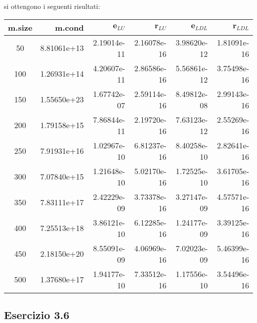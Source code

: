 si ottengono i seguenti risultati:\\
\begin{tabular}{ | c | r | r | r | r | r | }
\hline
        \textbf{m.size} & \textbf{m.cond} & $\mathbf{e}_{LU} $ & $\mathbf{r}_{LU} $  &  $\mathbf{e}_{LDL}$  &  $\mathbf{r}_{LDL} $ \\
\hline
         50    &     8.81061e+13 		&  2.19014e-11  &  2.16078e-16  &  3.98620e-12  &  1.81091e-16  \\
        100    &    1.26931e+14  	&  4.20607e-11  &  2.86586e-16  &  5.56861e-12  &  3.75498e-16  \\
        150    &    1.55650e+23  	&  1.67742e-07  &  2.59114e-16  &  8.49812e-08  &  2.99143e-16  \\
        200    &    1.79158e+15  	&  7.86844e-11  &  2.19720e-16  &  7.63123e-12  &  2.55269e-16  \\
        250    &    7.91931e+16  	&  1.02967e-10  &  6.81237e-16  &  8.40258e-10  &  2.82641e-16  \\
        300    &    7.07840e+15  	&  1.21648e-10  &  5.02170e-16  &  1.72525e-10  &  3.61705e-16  \\
        350    &    7.83111e+17  	&  2.42229e-09  &  3.73378e-16  &  3.27147e-09  &  4.57571e-16  \\
        400    &    7.25513e+18  	&  3.86121e-10  &  6.12285e-16  &  1.24177e-09  &  3.39125e-16  \\
        450    &    2.18150e+20  	&  8.55091e-09  &  4.06969e-16  &  7.02023e-09  &  5.46399e-16  \\
        500    &    1.37680e+17  	&  1.94177e-10  &  7.33512e-16  &  1.17556e-10  &  3.54496e-16  \\
\hline
\end{tabular}



	\subsection{Esercizio 3.6}

